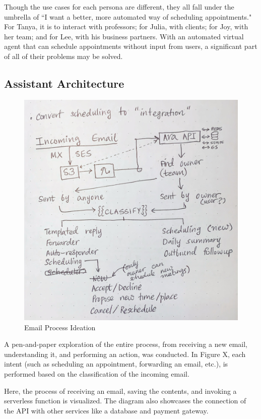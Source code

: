 \documentclass{article}
\begin{document}
Though the use cases for each persona are different, they all fall under the umbrella of ``I want a better, more automated way of scheduling appointments." For Tanya, it is to interact with professors; for Julia, with clients; for Joy, with her team; and for Lee, with his business partners. With an automated virtual agent that can schedule appointments without input from users, a significant part of all of their problems may be solved.

\subsection{Assistant Architecture}

\begin{figure}\centering
	\includegraphics[scale=0.097]{drawing-all-process.jpg}
	\caption{Email Process Ideation}
\end{figure}

A pen-and-paper exploration of the entire process, from receiving a new email, understanding it, and performing an action, was conducted. In Figure X, each intent (such as scheduling an appointment, forwarding an email, etc.), is performed based on the classification of the incoming email.

Here, the process of receiving an email, saving the contents, and invoking a serverless function is visualized. The diagram also showcases the connection of the API with other services like a database and payment gateway.
\end{document}

